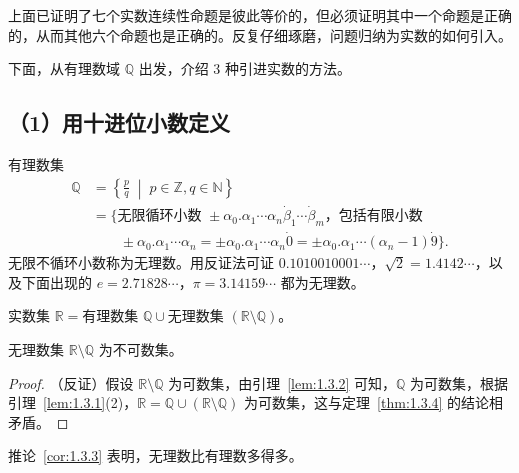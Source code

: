 上面已证明了七个实数连续性命题是彼此等价的，但必须证明其中一个命题是正确的，从而其他六个命题也是正确的。反复仔细琢磨，问题归纳为实数的如何引入。

下面，从有理数域 $\mathbb{Q}$ 出发，介绍 3 种引进实数的方法。

\subsection*{（1）用十进位小数定义}
有理数集
\begin{align*}
\mathbb{Q} &= \left\{\frac{p}{q} \;\middle|\; p \in \mathbb{Z}, q \in \mathbb{N}\right\} \\
&= \{\text{无限循环小数 } \pm \alpha_0.\alpha_1\cdots\alpha_n \dot{\beta}_1\cdots\dot{\beta}_m\text{，包括有限小数} \\
&\qquad \pm\alpha_0.\alpha_1\cdots\alpha_n = \pm\alpha_0.\alpha_1\cdots\alpha_n \dot{0} = \pm\alpha_0.\alpha_1\cdots(\alpha_n-1)\dot{9}\}.
\end{align*}
无限不循环小数称为无理数。用反证法可证 $0.1010010001\cdots$，$\sqrt{2} = 1.4142\cdots$，以及下面出现的 $e = 2.71828\cdots$，$\pi = 3.14159\cdots$ 都为无理数。

实数集 $\mathbb{R} = \text{有理数集 }\mathbb{Q} \cup \text{无理数集 }(\mathbb{R} \setminus \mathbb{Q})$。

\begin{corollary}\label{cor:1.3.3}
无理数集 $\mathbb{R} \setminus \mathbb{Q}$ 为不可数集。
\end{corollary}

\begin{proof}
（反证）假设 $\mathbb{R} \setminus \mathbb{Q}$ 为可数集，由引理~\ref{lem:1.3.2} 可知，$\mathbb{Q}$ 为可数集，根据引理~\ref{lem:1.3.1}(2)，$\mathbb{R} = \mathbb{Q} \cup (\mathbb{R} \setminus \mathbb{Q})$ 为可数集，这与定理~\ref{thm:1.3.4} 的结论相矛盾。
\end{proof}

推论~\ref{cor:1.3.3} 表明，无理数比有理数多得多。

